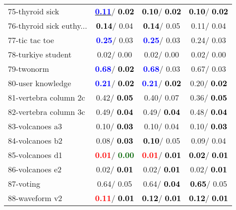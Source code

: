 \begin{table}[h]
\begin{center}
\begin{tabular}{lc|c|c}
75-thyroid sick & \underline{\textcolor{blue}{\textbf{  0.11}}}/\textcolor{black}{\textbf{  0.02}} & \textcolor{black}{\textbf{  0.10}}/\textcolor{black}{\textbf{  0.02}} & \textcolor{black}{\textbf{  0.10}}/\textcolor{black}{\textbf{  0.02}} \\
76-thyroid sick euthy... & \textcolor{black}{\textbf{  0.14}}/  0.04 & \textcolor{black}{\textbf{  0.14}}/  0.05 &   0.11/  0.04 \\
77-tic tac toe & \textcolor{blue}{\textbf{  0.25}}/  0.03 & \textcolor{blue}{\textbf{  0.25}}/  0.03 &   0.24/  0.03 \\
78-turkiye student &   0.02/  0.00 &   0.02/  0.00 &   0.02/  0.00 \\ \hline
79-twonorm & \textcolor{blue}{\textbf{  0.68}}/\textcolor{black}{\textbf{  0.02}} & \textcolor{blue}{\textbf{  0.68}}/  0.03 &   0.67/  0.03 \\
80-user knowledge & \textcolor{blue}{\textbf{  0.21}}/\textcolor{black}{\textbf{  0.02}} & \textcolor{blue}{\textbf{  0.21}}/\textcolor{black}{\textbf{  0.02}} &   0.20/\textcolor{black}{\textbf{  0.02}} \\
81-vertebra column 2c &   0.42/\textcolor{black}{\textbf{  0.05}} &   0.40/  0.07 &   0.36/\textcolor{black}{\textbf{  0.05}} \\
82-vertebra column 3c &   0.49/\textcolor{black}{\textbf{  0.04}} &   0.49/\textcolor{black}{\textbf{  0.04}} &   0.48/\textcolor{black}{\textbf{  0.04}} \\
83-volcanoes a3 &   0.10/\textcolor{black}{\textbf{  0.03}} &   0.10/  0.04 &   0.10/\textcolor{black}{\textbf{  0.03}} \\
84-volcanoes b2 &   0.08/\textcolor{black}{\textbf{  0.03}} & \textcolor{black}{\textbf{  0.10}}/  0.05 &   0.09/  0.04 \\
85-volcanoes d1 & \textcolor{red}{\textbf{  0.01}}/\textcolor{darkgreen}{\textbf{  0.00}} & \textcolor{red}{\textbf{  0.01}}/\textcolor{black}{\textbf{  0.01}} & \textcolor{black}{\textbf{  0.02}}/\textcolor{black}{\textbf{  0.01}} \\ \hline
86-volcanoes e2 &   0.02/\textcolor{black}{\textbf{  0.01}} &   0.02/\textcolor{black}{\textbf{  0.01}} &   0.02/\textcolor{black}{\textbf{  0.01}} \\
87-voting &   0.64/  0.05 &   0.64/\textcolor{black}{\textbf{  0.04}} & \textcolor{black}{\textbf{  0.65}}/  0.05 \\
88-waveform v2 & \textcolor{red}{\textbf{  0.11}}/\textcolor{black}{\textbf{  0.01}} & \textcolor{black}{\textbf{  0.12}}/\textcolor{black}{\textbf{  0.01}} & \textcolor{black}{\textbf{  0.12}}/\textcolor{black}{\textbf{  0.01}} \\

\end{tabular}
\end{center}
\end{table}
